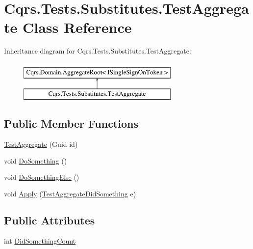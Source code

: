 \hypertarget{classCqrs_1_1Tests_1_1Substitutes_1_1TestAggregate}{}\section{Cqrs.\+Tests.\+Substitutes.\+Test\+Aggregate Class Reference}
\label{classCqrs_1_1Tests_1_1Substitutes_1_1TestAggregate}
Inheritance diagram for Cqrs.\+Tests.\+Substitutes.\+Test\+Aggregate\+:\begin{figure}[H]
\begin{center}
\leavevmode
\includegraphics[height=2.000000cm]{classCqrs_1_1Tests_1_1Substitutes_1_1TestAggregate}
\end{center}
\end{figure}
\subsection*{Public Member Functions}
\begin{DoxyCompactItemize}
\item 
\hyperlink{classCqrs_1_1Tests_1_1Substitutes_1_1TestAggregate_a037a8183b69a72695e4dc35b1ba128ca_a037a8183b69a72695e4dc35b1ba128ca}{Test\+Aggregate} (Guid id)
\item 
void \hyperlink{classCqrs_1_1Tests_1_1Substitutes_1_1TestAggregate_acb912c64b9ed2184e998448ab5fe524b_acb912c64b9ed2184e998448ab5fe524b}{Do\+Something} ()
\item 
void \hyperlink{classCqrs_1_1Tests_1_1Substitutes_1_1TestAggregate_a402ed6555ed4e80deb4cdccfd8d3bde8_a402ed6555ed4e80deb4cdccfd8d3bde8}{Do\+Something\+Else} ()
\item 
void \hyperlink{classCqrs_1_1Tests_1_1Substitutes_1_1TestAggregate_a32df0d885ad650dac9b815168f6a390e_a32df0d885ad650dac9b815168f6a390e}{Apply} (\hyperlink{classCqrs_1_1Tests_1_1Substitutes_1_1TestAggregateDidSomething}{Test\+Aggregate\+Did\+Something} e)
\end{DoxyCompactItemize}
\subsection*{Public Attributes}
\begin{DoxyCompactItemize}
\item 
int \hyperlink{classCqrs_1_1Tests_1_1Substitutes_1_1TestAggregate_a589a358905081830d8be4b5c118d0e8b_a589a358905081830d8be4b5c118d0e8b}{Did\+Something\+Count}
\end{DoxyCompactItemize}
